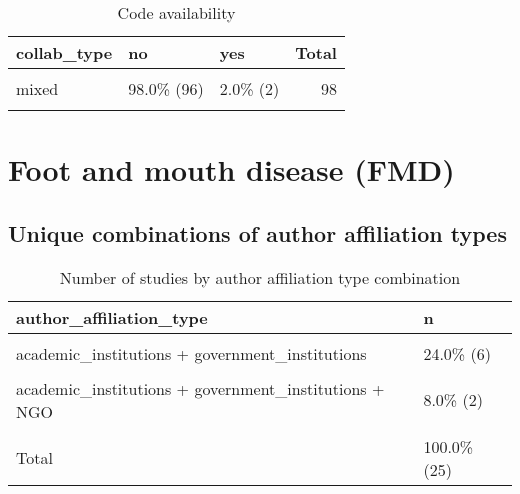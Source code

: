 \documentclass[
]{article}
\begin{document}
\begin{table}[H]

\caption{\label{tab:unnamed-chunk-40}Code availability}
\centering
\begin{tabular}[t]{lllr}
\toprule
collab\_type & no & yes & Total\\
\midrule
\cellcolor{gray!6}{purely\_academic} & \cellcolor{gray!6}{98.4\% (127)} & \cellcolor{gray!6}{1.6\% (2)} & \cellcolor{gray!6}{129}\\
mixed & 98.0\%  (96) & 2.0\% (2) & 98\\
\cellcolor{gray!6}{Total} & \cellcolor{gray!6}{98.2\% (223)} & \cellcolor{gray!6}{1.8\% (4)} & \cellcolor{gray!6}{227}\\
\bottomrule
\end{tabular}
\end{table}

\hypertarget{foot-and-mouth-disease-fmd}{%
\section{Foot and mouth disease
(FMD)}\label{foot-and-mouth-disease-fmd}}

\hypertarget{unique-combinations-of-author-affiliation-types}{%
\subsection{Unique combinations of author affiliation
types}\label{unique-combinations-of-author-affiliation-types}}

\begin{table}[H]

\caption{\label{tab:unnamed-chunk-42}Number of studies by author affiliation type combination}
\centering
\begin{tabular}[t]{ll}
\toprule
author\_affiliation\_type & n\\
\midrule
\cellcolor{gray!6}{academic\_institutions} & \cellcolor{gray!6}{44.0\% (11)}\\
academic\_institutions + government\_institutions & 24.0\%  (6)\\
\cellcolor{gray!6}{government\_institutions} & \cellcolor{gray!6}{20.0\%  (5)}\\
academic\_institutions + government\_institutions + NGO & 8.0\%  (2)\\
\cellcolor{gray!6}{government\_institutions + NGO} & \cellcolor{gray!6}{4.0\%  (1)}\\
\addlinespace
Total & 100.0\% (25)\\
\bottomrule
\end{tabular}
\end{table}
\end{document}

